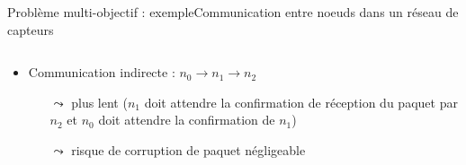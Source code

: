 \documentclass[compress]{beamer}
\theoremstyle{theorem}%
\begin{document}
\begin{frame}{Problème multi-objectif : exemple}{Communication entre noeuds dans un réseau de capteurs}
\begin{columns}
\begin{column}{0.6\linewidth}
\begin{itemize}
      \begin{itemize}
      \footnotesize
        \item[$\leadsto$] plus rapide que de passer par un noeud intermédiaire
        \item[$\leadsto$] risque de corruption des paquets envoyés (bruit)
      \end{itemize}
      \vspace{-.04\linewidth}
      \item Communication indirecte : $n_0 \rightarrow n_1 \rightarrow n_2$
      \vspace{-.1\linewidth}
      \begin{itemize}
        \footnotesize
        \item[$\leadsto$] plus lent ($n_1$ doit attendre la confirmation de réception du paquet par $n_2$ et $n_0$ doit attendre la confirmation de $n_1$)
        \item[$\leadsto$] risque de corruption de paquet négligeable
      \end{itemize}
    \end{itemize}
\end{column}
\end{columns}
\end{frame}
\end{document}
